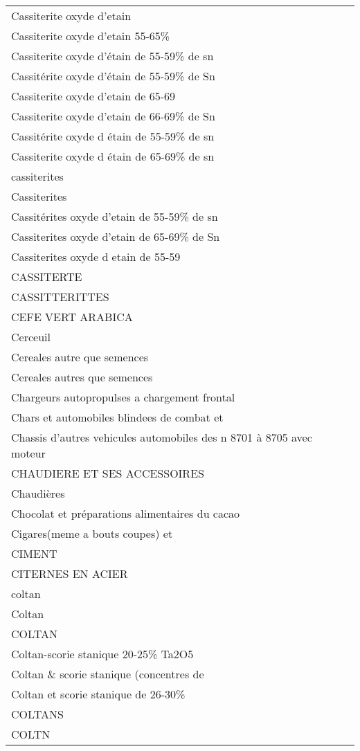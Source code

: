 \documentclass[
]{book}
\begin{document}
\begin{longtable}[t]{l}
Cassiterite oxyde d'etain\\
Cassiterite oxyde d'etain 55-65\%\\
Cassiterite oxyde d'étain de 55-59\% de sn\\
\addlinespace
Cassitérite oxyde d'étain de 55-59\% de Sn\\
Cassiterite oxyde d'etain de 65-69\\
Cassiterite oxyde d'etain de 66-69\% de Sn\\
Cassitérite oxyde d étain de 55-59\% de sn\\
Cassiterite oxyde d étain de 65-69\% de sn\\
\addlinespace
cassiterites\\
Cassiterites\\
Cassitérites oxyde d'etain de 55-59\% de sn\\
Cassiterites oxyde d'etain de 65-69\% de Sn\\
Cassiterites oxyde d etain de 55-59\\
\addlinespace
CASSITERTE\\
CASSITTERITTES\\
CEFE VERT ARABICA\\
Cerceuil\\
Cereales autre que semences\\
\addlinespace
Cereales autres que semences\\
Chargeurs autopropulses a chargement frontal\\
Chars et automobiles blindees de combat et\\
Chassis d'autres vehicules automobiles des n 8701 à 8705 avec moteur\\
CHAUDIERE ET SES ACCESSOIRES\\
\addlinespace
Chaudières\\
Chocolat et préparations alimentaires du cacao\\
Cigares(meme a bouts coupes) et\\
CIMENT\\
CITERNES EN ACIER\\
\addlinespace
coltan\\
Coltan\\
COLTAN\\
Coltan-scorie stanique 20-25\% Ta2O5\\
Coltan \& scorie stanique (concentres de\\
\addlinespace
Coltan et scorie stanique de 26-30\%\\
COLTANS\\
COLTN\\

\end{longtable}
\end{document}
